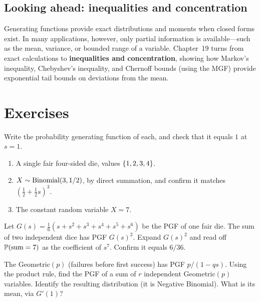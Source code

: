 \subsection*{Looking ahead: inequalities and concentration}
Generating functions provide exact distributions and moments when closed forms exist.
In many applications, however, only partial information is available---such as the mean,
variance, or bounded range of a variable.
Chapter~19 turns from exact calculations to \textbf{inequalities and concentration},
showing how Markov's inequality, Chebyshev's inequality, and Chernoff bounds
(using the MGF) provide exponential tail bounds on deviations from the mean.

\section{Exercises}
\label{ch18:exercises}

\begin{exercise}
\label{ch18:ex-warmup}
Write the probability generating function of each, and check that it equals $1$
at $s=1$.
\begin{enumerate}[label=(\alph*)]
  \item A single fair four-sided die, values $\set{1,2,3,4}$.
  \item $X\sim\Bin(3,1/2)$, by direct summation, and confirm it matches
        $(\tfrac12+\tfrac12 s)^3$.
  \item The constant random variable $X=7$.
\end{enumerate}
\end{exercise}

\begin{exercise}
\label{ch18:ex-twodice}
Let $G(s)=\frac16(s+s^2+s^3+s^4+s^5+s^6)$ be the PGF of one fair die. The sum of
two independent dice has PGF $G(s)^2$. Expand $G(s)^2$ and read off
$\P(\text{sum}=7)$ as the coefficient of $s^7$. Confirm it equals $6/36$.
\end{exercise}

\begin{exercise}
\label{ch18:ex-negbin}
The Geometric$(p)$ (failures before first success) has PGF $p/(1-qs)$. Using the
product rule, find the PGF of a sum of $r$ independent Geometric$(p)$ variables.
Identify the resulting distribution (it is Negative Binomial). What is its mean,
via $G'(1)$?
\end{exercise}

